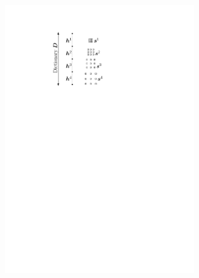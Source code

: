 \begin{figure}[!ht]
\begin{subfigure}[b]{0.32\textwidth}
	\includegraphics[width=0.9\textwidth]{figures/xp_explain/dictionary.pdf}
	\caption{}
\end{subfigure}
\begin{subfigure}[b]{0.32\textwidth}\centering

\end{subfigure}
\end{figure}
